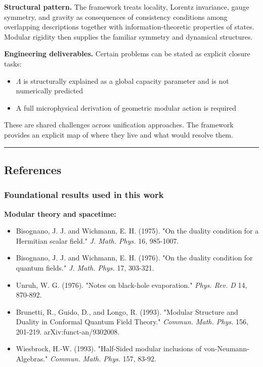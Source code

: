 \textbf{Structural pattern.} The framework treats locality, Lorentz invariance, gauge symmetry, and
gravity as consequences of consistency conditions among overlapping descriptions together with
information-theoretic properties of states. Modular rigidity then supplies the familiar symmetry
and dynamical structures.

\textbf{Engineering deliverables.} Certain problems can be stated as explicit closure tasks:

\begin{itemize}
\tightlist
\item
  \(\Lambda\) is structurally explained as a global capacity parameter and is not numerically predicted
\item
  A full microphysical derivation of geometric modular action is required
\end{itemize}

These are shared challenges across unification approaches. The framework provides an explicit map of where they live and what would resolve them.

\begin{center}\rule{0.5\linewidth}{0.5pt}\end{center}

\ifdefined\OPHSkipEmbeddedReferences
\else
\subsection{References}\label{references-paper}

\subsubsection{Foundational results used in this work}\label{foundational-results-used-in-this-work}

\textbf{Modular theory and spacetime:}

\begin{itemize}
\tightlist
\item
  Bisognano, J. J. and Wichmann, E. H. (1975). "On the duality condition for a Hermitian scalar field." \emph{J. Math. Phys.} 16, 985-1007.
\item
  Bisognano, J. J. and Wichmann, E. H. (1976). "On the duality condition for quantum fields." \emph{J. Math. Phys.} 17, 303-321.
\item
  Unruh, W. G. (1976). "Notes on black-hole evaporation." \emph{Phys. Rev. D} 14, 870-892.
\item
  Brunetti, R., Guido, D., and Longo, R. (1993). "Modular Structure and Duality in Conformal Quantum Field Theory." \emph{Commun. Math. Phys.} 156, 201-219. arXiv:funct-an/9302008.
\item
  Wiesbrock, H.-W. (1993). "Half-Sided modular inclusions of von-Neumann-Algebras." \emph{Commun. Math. Phys.} 157, 83-92.
\end{itemize}

